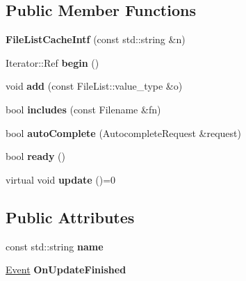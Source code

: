 \subsection*{Public Member Functions}
\begin{DoxyCompactItemize}
\item 
\hypertarget{class_file_list_cache_intf_a91f696c9217198b78dbd3044e97527dc}{
{\bfseries FileListCacheIntf} (const std::string \&n)}
\label{class_file_list_cache_intf_a91f696c9217198b78dbd3044e97527dc}

\item 
\hypertarget{class_file_list_cache_intf_a329b1e6f876e5848cf5d08a66df5198f}{
Iterator::Ref {\bfseries begin} ()}
\label{class_file_list_cache_intf_a329b1e6f876e5848cf5d08a66df5198f}

\item 
\hypertarget{class_file_list_cache_intf_ade52d0e4118ead7a83d50e4e5a1992f4}{
void {\bfseries add} (const FileList::value\_\-type \&o)}
\label{class_file_list_cache_intf_ade52d0e4118ead7a83d50e4e5a1992f4}

\item 
\hypertarget{class_file_list_cache_intf_a0326779659d430cb90e7eb73a6e02361}{
bool {\bfseries includes} (const Filename \&fn)}
\label{class_file_list_cache_intf_a0326779659d430cb90e7eb73a6e02361}

\item 
\hypertarget{class_file_list_cache_intf_aa5bf3efa0841219072a4f1103583047c}{
bool {\bfseries autoComplete} (AutocompleteRequest \&request)}
\label{class_file_list_cache_intf_aa5bf3efa0841219072a4f1103583047c}

\item 
\hypertarget{class_file_list_cache_intf_a6564f447dbe5426574ca540a851d8fab}{
bool {\bfseries ready} ()}
\label{class_file_list_cache_intf_a6564f447dbe5426574ca540a851d8fab}

\item 
\hypertarget{class_file_list_cache_intf_a2604fdeb58068663900315b8727504f6}{
virtual void {\bfseries update} ()=0}
\label{class_file_list_cache_intf_a2604fdeb58068663900315b8727504f6}

\end{DoxyCompactItemize}
\subsection*{Public Attributes}
\begin{DoxyCompactItemize}
\item 
\hypertarget{class_file_list_cache_intf_adf37d944ff4e3ba6fed6eb0a80279999}{
const std::string {\bfseries name}}
\label{class_file_list_cache_intf_adf37d944ff4e3ba6fed6eb0a80279999}

\item 
\hypertarget{class_file_list_cache_intf_aefccb87cd54d7d42ca910f7fde8f9aa5}{
\hyperlink{class_event}{Event} {\bfseries OnUpdateFinished}}
\label{class_file_list_cache_intf_aefccb87cd54d7d42ca910f7fde8f9aa5}

\end{DoxyCompactItemize}

